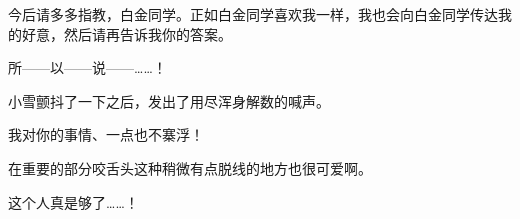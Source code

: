 今后请多多指教，白金同学。正如白金同学喜欢我一样，我也会向白金同学传达我的好意，然后请再告诉我你的答案。

所——以——说——……！

小雪颤抖了一下之后，发出了用尽浑身解数的喊声。

我对你的事情、一点也不寨浮！

在重要的部分咬舌头这种稍微有点脱线的地方也很可爱啊。

这个人真是够了……！
